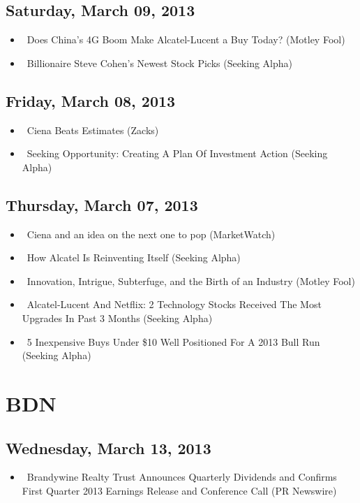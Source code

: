 \documentclass[11pt,asymmetric]{article}
\begin{document}
\subsection*{Saturday, March 09, 2013}
\begin{itemize}
\item\ Does China's 4G Boom Make Alcatel-Lucent a Buy Today? (Motley Fool)
\item\ Billionaire Steve Cohen's Newest Stock Picks (Seeking Alpha)
\end{itemize}
\subsection*{Friday, March 08, 2013}
\begin{itemize}
\item\ Ciena Beats Estimates (Zacks)
\item\ Seeking Opportunity: Creating A Plan Of Investment Action (Seeking Alpha)
\end{itemize}
\subsection*{Thursday, March 07, 2013}
\begin{itemize}
\item\ Ciena and an idea on the next one to pop (MarketWatch)
\item\ How Alcatel Is Reinventing Itself (Seeking Alpha)
\item\ Innovation, Intrigue, Subterfuge, and the Birth of an Industry (Motley Fool)
\item\ Alcatel-Lucent And Netflix: 2 Technology Stocks Received The Most Upgrades In Past 3 Months (Seeking Alpha)
\item\ 5 Inexpensive Buys Under \$10 Well Positioned For A 2013 Bull Run (Seeking Alpha)
\end{itemize}

\section*{BDN}

\subsection*{Wednesday, March 13, 2013}
\begin{itemize}
\item\ Brandywine Realty Trust Announces Quarterly Dividends and Confirms First Quarter 2013 Earnings Release and Conference Call (PR Newswire)
\end{itemize}
\end{document}

